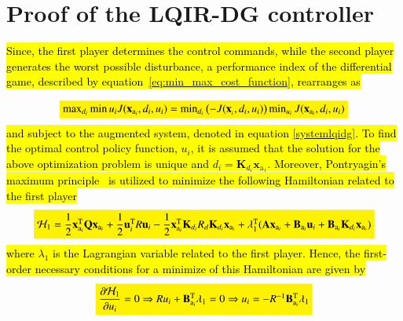 \documentclass[3p]{elsarticle}
\begin{document}
\section{Proof of the LQIR-DG controller}
\hl{Since, the first player determines the control commands, while the second player generates the worst possible disturbance, a performance index of the differential game, described by equation~{\eqref{eq:min_max_cost_function}}, rearranges as}

\begin{equation}
    \colorbox{yellow}{$\max_{d_i}\min{u_i} J(\mathbf{x}_{\mathrm{a}_i}, d_i, u_i) = \min_{d_i}\left(-J(\mathbf{x}_{_i}, d_i, u_i)\right)\min_{u_i}J(\mathbf{x}_{\mathrm{a}_i}, d_i, u_i)$}
\end{equation}
\hl{and subject to the augmented system, denoted in equation {\eqref{systemlqidg}}. To find the optimal control policy function, $u_i$, it is assumed that the solution for the above optimization problem is unique and $d_i = \mathbf{K}_{d_i}\mathbf{x}_{\mathrm{a}_1}$.
Moreover, Pontryagin's maximum principle~{\cite{kirk2004optimal}} is utilized to minimize the following Hamiltonian related to the first player}
\begin{equation}
    \colorbox{yellow}{$\mathcal{H}_1 = \dfrac{1}{2}\mathbf{x}_{\mathrm{a}_i}^\mathrm{T} \mathbf{Q} \mathbf{x}_{\mathrm{a}_i} + \dfrac{1}{2}\mathbf{u}_i^\mathrm{T} R \mathbf{u}_i - \dfrac{1}{2}\mathbf{x}_{\mathrm{a}_i}^\mathrm{T} \mathbf{K}_{d_i} R_{d} \mathbf{K}_{d_i}  \mathbf{x}_{\mathrm{a}_i} + \lambda_1^\mathrm{T}(\mathbf{A}\mathbf{x}_{\mathrm{a}_i} + \mathbf{B}_{\mathrm{a}_i}\mathbf{u}_i + \mathbf{B}_{\mathrm{a}_i}\mathbf{K}_{d_i}\mathbf{x}_{\mathrm{a}_i})$}
\end{equation}
    \hl{where $\lambda_1$ is the Lagrangian variable related to the first player. Hence, the first-order necessary conditions for a minimize of this Hamiltonian are given by}
    \begin{equation}\label{eq:Hamiltonian_u}
        \colorbox{yellow}{$\dfrac{\partial \mathcal{H}_1}{\partial u_i} = 0 \Rightarrow Ru_i + \mathbf{B}_{\mathrm{a}_i}^\mathrm{T}\lambda_1 = 0 \Rightarrow u_i = -R^{-1}\mathbf{B}_{\mathrm{a}_i}^\mathrm{T}\lambda_1$}
    \end{equation}
    
\end{document}
